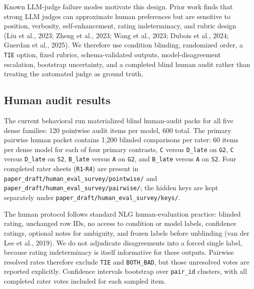 \documentclass[11pt]{article}
\begin{document}
Known LLM-judge failure modes motivate this design. Prior work finds that strong LLM judges can approximate human preferences but are sensitive to position, verbosity, self-enhancement, rating indeterminacy, and rubric design (Liu et al., 2023; Zheng et al., 2023; Wang et al., 2023; Dubois et al., 2024; Guerdan et al., 2025). We therefore use condition blinding, randomized order, a \texttt{TIE} option, fixed rubrics, schema-validated outputs, model-disagreement escalation, bootstrap uncertainty, and a completed blind human audit rather than treating the automated judge as ground truth.

\subsection{Human audit results}

The current behavioral run materialized blind human-audit packs for all five dense families: 120 pointwise audit items per model, 600 total. The primary pairwise human packet contains 1,200 blinded comparisons per rater: 60 items per dense model for each of four primary contrasts, \texttt{C} versus \texttt{D\_late} on \texttt{G2}, \texttt{C} versus \texttt{D\_late} on \texttt{S2}, \texttt{B\_late} versus \texttt{A} on \texttt{G2}, and \texttt{B\_late} versus \texttt{A} on \texttt{S2}. Four completed rater sheets (\texttt{R1}-\texttt{R4}) are present in \texttt{paper\_draft/human\_eval\_survey/pointwise/} and \texttt{paper\_draft/human\_eval\_survey/pairwise/}; the hidden keys are kept separately under \texttt{paper\_draft/human\_eval\_survey/keys/}.

The human protocol follows standard NLG human-evaluation practice: blinded rating, unchanged row IDs, no access to condition or model labels, confidence ratings, optional notes for ambiguity, and frozen labels before unblinding (van der Lee et al., 2019). We do not adjudicate disagreements into a forced single label, because rating indeterminacy is itself informative for these outputs. Pairwise resolved rates therefore exclude \texttt{TIE} and \texttt{BOTH\_BAD}, but those unresolved votes are reported explicitly. Confidence intervals bootstrap over \texttt{pair\_id} clusters, with all completed rater votes included for each sampled item.
\end{document}
